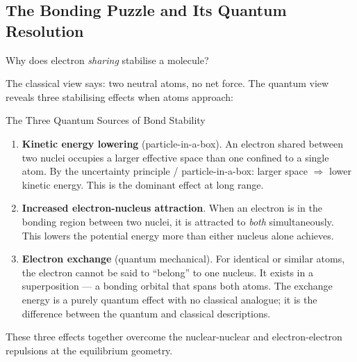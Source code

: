 \documentclass[12pt, a4paper]{book}
\begin{document}
\subsection{The Bonding Puzzle and Its Quantum Resolution}

Why does electron \emph{sharing} stabilise a molecule?

The classical view says: two neutral atoms, no net force.
The quantum view reveals three stabilising effects
when atoms approach:

\begin{namedconcept}{The Three Quantum Sources of Bond Stability}
\begin{enumerate}[nosep, leftmargin=2em]
  \item \textbf{Kinetic energy lowering} (particle-in-a-box).
        An electron shared between two nuclei occupies a
        larger effective space than one confined to a
        single atom.
        By the uncertainty principle / particle-in-a-box:
        larger space $\Rightarrow$ lower kinetic energy.
        This is the dominant effect at long range.

  \item \textbf{Increased electron-nucleus attraction}.
        When an electron is in the bonding region between
        two nuclei, it is attracted to \emph{both} simultaneously.
        This lowers the potential energy more than either
        nucleus alone achieves.

  \item \textbf{Electron exchange} (quantum mechanical).
        For identical or similar atoms, the electron
        cannot be said to ``belong'' to one nucleus.
        It exists in a superposition --- a bonding orbital
        that spans both atoms.
        The exchange energy is a purely quantum effect with
        no classical analogue; it is the difference between
        the quantum and classical descriptions.
\end{enumerate}

These three effects together overcome the nuclear-nuclear
and electron-electron repulsions at the equilibrium geometry.
\end{namedconcept}
\end{document}
